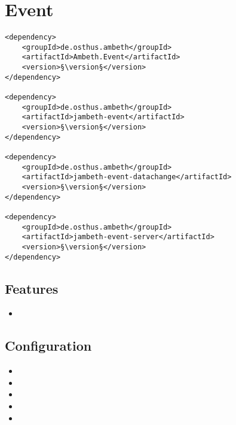 \section{Event}
\label{module:Event}
\ClearAPI
\TODO
\begin{lstlisting}[style=POM,caption={Maven modules to use \emph{Ambeth Event}}]
<dependency>
	<groupId>de.osthus.ambeth</groupId>
	<artifactId>Ambeth.Event</artifactId>
	<version>§\version§</version>
</dependency>

<dependency>
	<groupId>de.osthus.ambeth</groupId>
	<artifactId>jambeth-event</artifactId>
	<version>§\version§</version>
</dependency>

<dependency>
	<groupId>de.osthus.ambeth</groupId>
	<artifactId>jambeth-event-datachange</artifactId>
	<version>§\version§</version>
</dependency>

<dependency>
	<groupId>de.osthus.ambeth</groupId>
	<artifactId>jambeth-event-server</artifactId>
	<version>§\version§</version>
</dependency>
\end{lstlisting}
\subsection{Features}
\begin{itemize}
	\item \TODO
\end{itemize}

\subsection{Configuration}
\begin{itemize}
	\item {}
	\item {}
	\item {}
	\item {}
	\item {}
\end{itemize}
